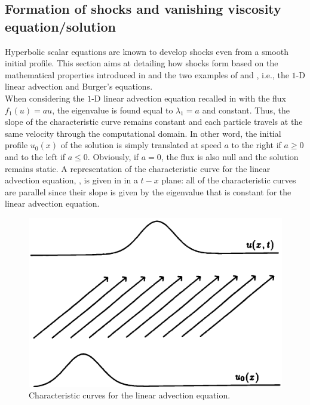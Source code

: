 \subsection{Formation of shocks and vanishing viscosity equation/solution}\label{sec:shock_form}
Hyperbolic scalar equations are known to develop shocks even from a smooth initial profile. This section aims at detailing how shocks form based on the mathematical properties introduced in  and the two examples of  and , i.e., the $1$-D linear advection and Burger's equations.\\

When considering the $1$-D linear advection equation recalled in  with the flux $f_1(u) = au$, the eigenvalue is found equal to $\lambda_1=a$ and constant. Thus, the slope of the characteristic curve remains constant and each particle travels at the same velocity through the computational domain. In other word, the initial profile $u_0(x)$ of the solution is simply translated at speed $a$ to the right if $a \geq 0$ and to the left if $a \leq 0$. Obviously, if $a=0$, the flux is also null and the solution remains static. A representation of the characteristic curve for the linear advection equation, , is given in  in a $t-x$ plane: all of the characteristic curves are parallel since their slope is given by the eigenvalue that is constant for the linear advection equation.
%
\begin{figure}[H]
\centering
\includegraphics[width=\textwidth]{figures/charact_curves_linear_transport.png}
\caption{Characteristic curves for the linear advection equation.}
\label{fig:char_curve_sct1b}
\end{figure}
